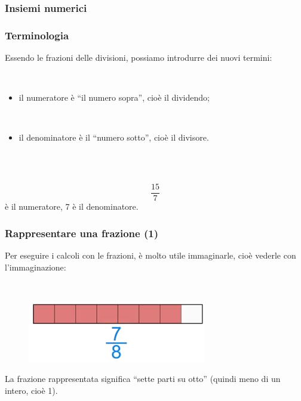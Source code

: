 \documentclass[]{beamer}
\theoremstyle{plain}
\begin{document}
\begin{frame}
\frametitle{Insiemi numerici}
\begin{figure}
\end{figure}
\end{frame}







\begin{frame}
\frametitle{Terminologia}
Essendo le frazioni delle divisioni, possiamo introdurre dei nuovi termini:

~

\begin{itemize}
  \item il \alert{numeratore} è ``il numero sopra'', cioè il dividendo;\pause
  
  ~
  \item il \alert{denominatore} è il ``numero sotto'', cioè il divisore.\pause
\end{itemize}

~

~
\[\frac{15}{7}\] è il numeratore, 7 è il denominatore.
\end{frame}




\begin{frame}
\frametitle{Rappresentare una frazione (1)}
Per eseguire i calcoli con le frazioni, è molto utile \alert{immaginarle}, cioè vederle con l'immaginazione:

~
\begin{figure}
  \includegraphics[width=.5\columnwidth]{img/fraz.png}
\end{figure}

La frazione rappresentata significa ``sette parti su otto'' (quindi meno di un intero, cioè 1).
\end{frame}
\end{document}
